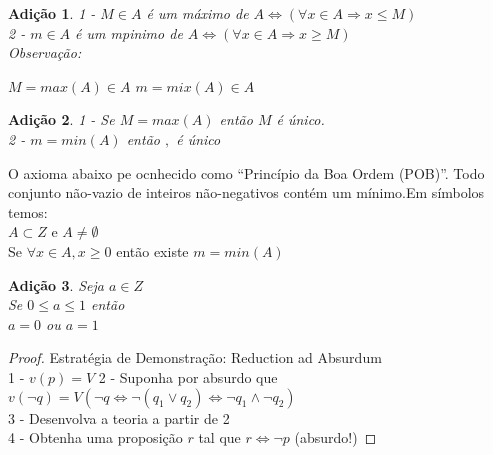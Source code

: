 \documentclass[a4paper,12pt]{article}
\newtheorem{add}{Adição}
\begin{document}
\begin{add} %
  1 - $M \in A$ é um máximo de $A  \iff (\forall x \in A \Longrightarrow x \leq M) $\\
  2 - $m \in A$ é um mpinimo de $A \iff (\forall x \in A \Longrightarrow x \geq M) $ \\

  Observação:
  
  $M = max(A) \in A$
  $m = mix(A) \in A$
\end{add}

\begin{add} %
  1 - Se $M = max(A)$ então $M$ é único.\\
  2 - $m  = min(A)$ então $,$ é único \\
\end{add}

O axioma abaixo pe ocnhecido como ``Princípio da Boa Ordem (POB)''. Todo conjunto não-vazio de inteiros não-negativos contém um mínimo.Em símbolos temos:\\
$A \subset Z$ e $A \neq \emptyset$\\
Se $\forall x \in A, x \ge 0$ então existe $m = min(A)$

\begin{add} %
  Seja $a \in Z$\\
  Se $0 \leq a \leq 1$ então\\
  $a = 0$ ou $a = 1$
\end{add}
\begin{proof}
  Estratégia de Demonstração: Reduction ad Absurdum\\

  1 - $v(p) =V$
  2 - Suponha por absurdo que $v(\neg q) = V (\neg q \iff \neg (q_1 \vee q_2) \iff \neg q_1 \wedge \neg q_2)$\\
  3 - Desenvolva a teoria a partir de 2\\
  4 - Obtenha uma proposição $r$ tal que $r \iff \neg p$ (absurdo!)
\end{proof}
\end{document}

